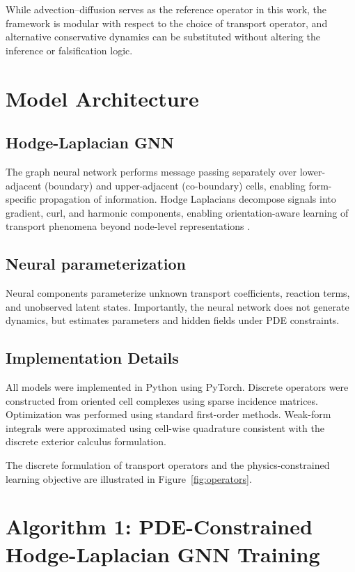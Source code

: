 \documentclass[10pt,article]{article}
\begin{document}
While advection–diffusion serves as the reference operator in this work, the framework is modular with respect to the choice of transport operator, and alternative conservative dynamics can be substituted without altering the inference or falsification logic.
\section{Model Architecture}

\subsection{Hodge-Laplacian GNN}

The graph neural network performs message passing separately over lower-adjacent (boundary) and upper-adjacent (co-boundary) cells, enabling form-specific propagation of information.
Hodge Laplacians decompose signals into gradient, curl, and harmonic components, enabling orientation-aware learning of transport phenomena beyond node-level representations \cite{lim2020hodge,roddenberry2022snnpde}.

\subsection{Neural parameterization}

Neural components parameterize unknown transport coefficients, reaction terms, and unobserved latent states. Importantly, the neural network does not generate dynamics, but estimates parameters and hidden fields under PDE constraints.

\subsection{Implementation Details}

All models were implemented in Python using PyTorch. Discrete operators were constructed from oriented cell complexes using sparse incidence matrices. Optimization was performed using standard first-order methods. Weak-form integrals were approximated using cell-wise quadrature consistent with the discrete exterior calculus formulation.

The discrete formulation of transport operators and the physics-constrained learning objective are illustrated in Figure~\ref{fig:operators}.

\section*{Algorithm 1: PDE-Constrained Hodge-Laplacian GNN Training}
\end{document}
